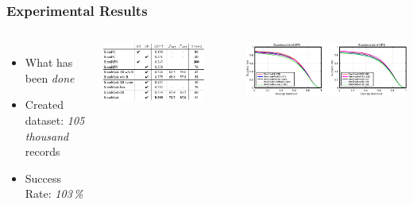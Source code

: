 
\begin{frame}
  \frametitle{Experimental Results}
  \begin{columns}
    \begin{itemize}
      \item What has been \emph{done}
      \item Created dataset: \emph{105\,thousand} records
      \item Success Rate: \emph{103\,\%}
    \end{itemize}
    
    \centering
    \includegraphics[width=0.8\textwidth]{img/template-ResultsTable.pdf}
    
    \bigskip
    \includegraphics[width=\textwidth]{img/template-ResultsPlot.pdf}
    
  \end{columns}
\end{frame}


